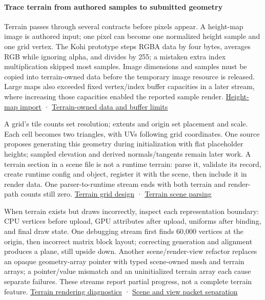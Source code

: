\paragraph{Trace terrain from authored samples to submitted geometry}\label{trace-terrain-from-authored-samples-to-submitted-geometry}

Terrain passes through several contracts before pixels appear. A height-map image is authored input; one pixel can become one normalized height sample and one grid vertex. The Kohi prototype steps RGBA data by four bytes, averages RGB while ignoring alpha, and divides by 255; a mistaken extra index multiplication skipped most samples. Image dimensions and samples must be copied into terrain-owned data before the temporary image resource is released. Large maps also exceeded fixed vertex/index buffer capacities in a later stream, where increasing those capacities enabled the reported sample render. \href{https://www.youtube.com/watch?v=hSvbfxOPCZ0}{Height-map import} · \href{https://www.youtube.com/watch?v=vLzvpFaX50A}{Terrain-owned data and buffer limits}

A grid's tile counts set resolution; extents and origin set placement and scale. Each cell becomes two triangles, with UVs following grid coordinates. One source proposes generating this geometry during initialization with flat placeholder heights; sampled elevation and derived normals/tangents remain later work. A terrain section in a scene file is not a runtime terrain: parse it, validate its record, create runtime config and object, register it with the scene, then include it in render data. One parser-to-runtime stream ends with both terrain and render-path counts still zero. \href{https://www.youtube.com/watch?v=unypFSvg7gI}{Terrain grid design} · \href{https://www.youtube.com/watch?v=o3VS8tbwaRI}{Terrain scene parsing}

When terrain exists but draws incorrectly, inspect each representation boundary: CPU vertices before upload, GPU attributes after upload, uniforms after binding, and final draw state. One debugging stream first finds 60,000 vertices at the origin, then incorrect matrix block layout; correcting generation and alignment produces a plane, still upside down. Another scene/render-view refactor replaces an opaque geometry-array pointer with typed scene-owned mesh and terrain arrays; a pointer/value mismatch and an uninitialized terrain array each cause separate failures. These streams report partial progress, not a complete terrain feature. \href{https://www.youtube.com/watch?v=N34cyDfZVtA}{Terrain rendering diagnostics} · \href{https://www.youtube.com/watch?v=JgMCoxs0nqo}{Scene and view packet separation}

